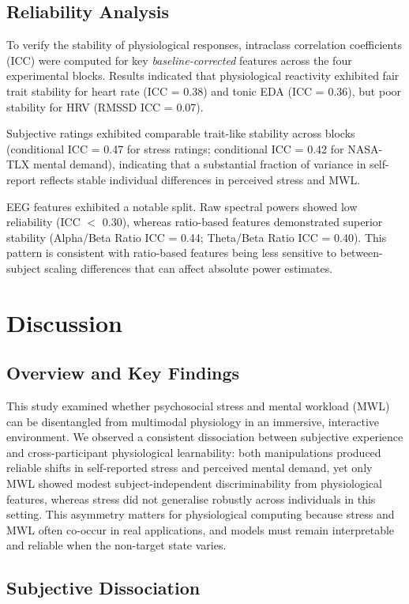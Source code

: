 \documentclass[lettersize,journal]{IEEEtran}
\begin{document}
\subsection{Reliability Analysis}
To verify the stability of physiological responses, intraclass correlation coefficients (ICC) were computed for key \textit{baseline-corrected} features across the four experimental blocks. Results indicated that physiological reactivity exhibited fair trait stability for heart rate (ICC = 0.38) and tonic EDA (ICC = 0.36), but poor stability for HRV (RMSSD ICC = 0.07).

Subjective ratings exhibited comparable trait-like stability across blocks (conditional ICC = 0.47 for stress ratings; conditional ICC = 0.42 for NASA-TLX mental demand), indicating that a substantial fraction of variance in self-report reflects stable individual differences in perceived stress and MWL.

EEG features exhibited a notable split. Raw spectral powers showed low reliability (ICC $<$ 0.30), whereas ratio-based features demonstrated superior stability (Alpha/Beta Ratio ICC = 0.44; Theta/Beta Ratio ICC = 0.40). This pattern is consistent with ratio-based features being less sensitive to between-subject scaling differences that can affect absolute power estimates.


\section{Discussion}

\subsection{Overview and Key Findings}
This study examined whether psychosocial stress and mental workload (MWL) can be disentangled from multimodal physiology in an immersive, interactive environment. We observed a consistent dissociation between subjective experience and cross-participant physiological learnability: both manipulations produced reliable shifts in self-reported stress and perceived mental demand, yet only MWL showed modest subject-independent discriminability from physiological features, whereas stress did not generalise robustly across individuals in this setting. This asymmetry matters for physiological computing because stress and MWL often co-occur in real applications, and models must remain interpretable and reliable when the non-target state varies.

\subsection{Subjective Dissociation}
\end{document}
